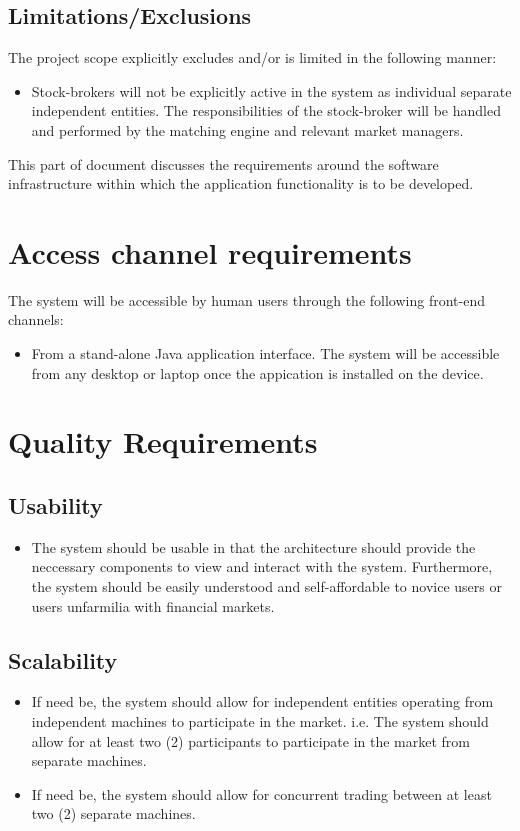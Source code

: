 \documentclass[12pt]{article}
\begin{document}
				\subsection{Limitations/Exclusions}
				The project scope explicitly excludes and/or is limited in the following manner:
				\begin{itemize}
				\item Stock-brokers will not be explicitly active in the system as individual separate independent entities. The responsibilities of the stock-broker will be handled and performed by the matching engine and relevant market managers.
				\end{itemize}
					  
				  
		\newpage
		This part of document discusses the requirements around the software infrastructure within which the application functionality is to be developed. 
		\section{Access channel requirements}
		The system will be accessible by human users through the following front-end channels:
		\begin{itemize}
		\item From a stand-alone Java application interface. The system will be accessible from any desktop or laptop once the appication is installed on the device.
		\end{itemize}
		
		\section{Quality Requirements}
			\subsection{Usability}
			\begin{itemize}
			\item The system should be usable in that the architecture should provide the neccessary components to view and interact with the system. Furthermore, the system should be easily understood and self-affordable to novice users or users unfarmilia with financial markets.
			\end{itemize}
			\subsection{Scalability}
			\begin{itemize}
			\item If need be, the system should allow for independent entities operating from independent machines to participate in the market. i.e. The system should allow for at least two (2) participants to participate in the market from separate machines.
			\item If need be, the system should allow for concurrent trading between at least two (2) separate machines.
			\end{itemize}
\end{document}
